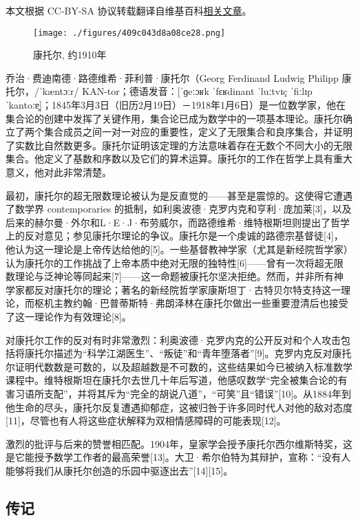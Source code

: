 
本文根据 CC-BY-SA 协议转载翻译自维基百科\href{https://en.wikipedia.org/wiki/Georg_\%E5\%BA\%B7\%E6\%89\%98\%E5\%B0\%94}{相关文章}。

\begin{figure}[ht]
\centering
\texttt{[image: ./figures/409c043d8a08ce28.png]}
\caption{康托尔, 约1910年} \label{fig_Canto_1}
\end{figure}
乔治·费迪南德·路德维希·菲利普·康托尔（Georg Ferdinand Ludwig Philipp 康托尔，/ˈkæntɔːr/ KAN-tor；德语发音：[ˈɡeːɔʁk ˈfɛʁdinant ˈluːtvɪç ˈfiːlɪp ˈkantoːɐ̯]；1845年3月3日（旧历2月19日）－1918年1月6日）是一位数学家，他在集合论的创建中发挥了关键作用，集合论已成为数学中的一项基本理论。康托尔确立了两个集合成员之间一对一对应的重要性，定义了无限集合和良序集合，并证明了实数比自然数更多。康托尔证明该定理的方法意味着存在无数个不同大小的无限集合。他定义了基数和序数以及它们的算术运算。康托尔的工作在哲学上具有重大意义，他对此非常清楚。

最初，康托尔的超无限数理论被认为是反直觉的——甚至是震惊的。这使得它遭遇了数学界 contemporaries 的抵制，如利奥波德·克罗内克和亨利·庞加莱[3]，以及后来的赫尔曼·外尔和L·E·J·布劳威尔，而路德维希·维特根斯坦则提出了哲学上的反对意见；参见康托尔理论的争议。康托尔是一个虔诚的路德宗基督徒[4]，他认为这一理论是上帝传达给他的[5]。一些基督教神学家（尤其是新经院哲学家）认为康托尔的工作挑战了上帝本质中绝对无限的独特性[6]——曾有一次将超无限数理论与泛神论等同起来[7]——这一命题被康托尔坚决拒绝。然而，并非所有神学家都反对康托尔的理论；著名的新经院哲学家康斯坦丁·古特贝尔特支持这一理论，而枢机主教约翰·巴普蒂斯特·弗朗泽林在康托尔做出一些重要澄清后也接受了这一理论作为有效理论[8]。

对康托尔工作的反对有时非常激烈：利奥波德·克罗内克的公开反对和个人攻击包括将康托尔描述为“科学江湖医生”、“叛徒”和“青年堕落者”[9]。克罗内克反对康托尔证明代数数是可数的，以及超越数是不可数的，这些结果如今已被纳入标准数学课程中。维特根斯坦在康托尔去世几十年后写道，他感叹数学“完全被集合论的有害习语所支配”，并将其斥为“完全的胡说八道”，“可笑”且“错误”[10]。从1884年到他生命的尽头，康托尔反复遭遇抑郁症，这被归咎于许多同时代人对他的敌对态度[11]，尽管也有人将这些症状解释为双相情感障碍的可能表现[12]。

激烈的批评与后来的赞誉相匹配。1904年，皇家学会授予康托尔西尔维斯特奖，这是它能授予数学工作者的最高荣誉[13]。大卫·希尔伯特为其辩护，宣称：“没有人能够将我们从康托尔创造的乐园中驱逐出去”[14][15]。
\subsection{传记}  
